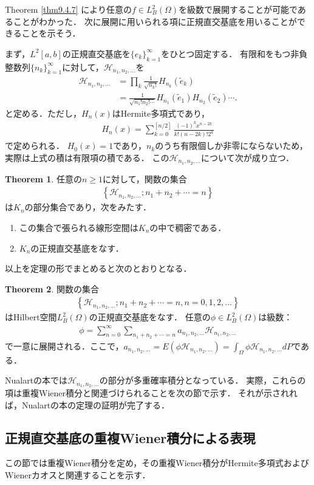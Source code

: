 \documentclass[a4paper,10pt]{jsarticle}
\theoremstyle{definition}
\newtheorem{theorem}{Theorem}
\newcommand{\eq}[1]{\begin{align}#1\end{align}}
\newcommand{\enums}[1]{\begin{enumerate}#1\end{enumerate}}
\begin{document}
Theorem \ref{thm9.4.7} により任意の$f\in L^2_B(\Omega)$を級数で展開することが可能であることがわかった．
次に展開に用いられる項に正規直交基底を用いることができることを示そう．

まず，$L^2[a,b]$の正規直交基底を$\{e_k\}_{k=1}^\infty$をひとつ固定する．
有限和をもつ非負整数列$\{n_k\}_{k=1}^\infty$に対して，$\mathcal{H}_{n_1,n_2,...}$を
\eq{\mathcal{H}_{n_1,n_2,...}
	&=\prod_k\frac{1}{\sqrt{n_k!}}H_{n_k}(\tilde{e}_k)\\
	&=\frac{1}{\sqrt{n_1!n_2!\cdots}}H_{n_1}(\tilde{e}_1)H_{n_2}(\tilde{e}_2)\cdots.}
と定める．ただし，$H_n(x)$はHermite多項式であり，
\eq{H_n(x)=\sum_{k=0}^{[n/2]}\frac{(-1)^kx^{n-2k}}{k!(n-2k)!2^k}}
で定められる．
$H_0(x)=1$であり，$n_k$のうち有限個しか非零にならないため，実際は上式の積は有限項の積である．
この$\mathcal{H}_{n_1,n_2,...}$について次が成り立つ．
\begin{theorem}\label{thm9.5.3and9.5.4}%
任意の$n\ge1$に対して，関数の集合
\eq{\left\{\mathcal{H}_{n_1,n_2,...};n_1+n_2+\cdots=n\right\}}
は$K_n$の部分集合であり，次をみたす．
\enums{
	\item この集合で張られる線形空間は$K_n$の中で稠密である．
	\item $K_n$の正規直交基底をなす．
}
\end{theorem}

以上を定理の形でまとめると次のとおりとなる．
\begin{theorem}\label{thm9.5.7}%
関数の集合
\eq{\left\{\mathcal{H}_{n_1,n_2,...};n_1+n_2+\cdots=n,n=0,1,2,...\right\}}
はHilbert空間$L^2_B(\Omega)$の正規直交基底をなす．
任意の$\phi\in L^2_B(\Omega)$は級数：
\eq{\phi=\sum_{n=0}^\infty\sum_{n_1+n_2+\cdots=n}a_{n_1,n_2,...}\mathcal{H}_{n_1,n_2,...}}
で一意に展開される．ここで，$a_{n_1,n_2,...}=E(\phi\mathcal{H}_{n_1,n_2,...})=\int_\Omega\phi\mathcal{H}_{n_1,n_2,...}dP$である．
\end{theorem}
Nualartの本では$\mathcal{H}_{n_1,n_2,...}$の部分が多重確率積分となっている．
実際，これらの項は重複Wiener積分と関連づけられることを次の節で示す．
それが示されれば，Nualartの本の定理の証明が完了する．

\subsection{正規直交基底の重複Wiener積分による表現}
この節では重複Wiener積分を定め，その重複Wiener積分がHermite多項式およびWienerカオスと関連することを示す．
\end{document}
